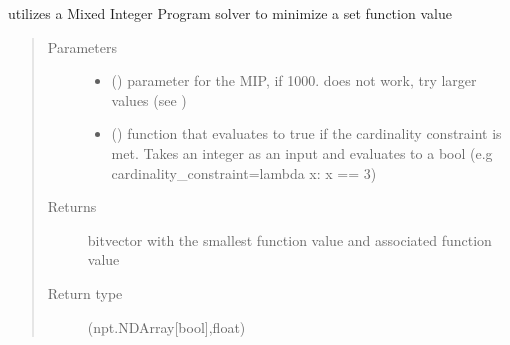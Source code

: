 \documentclass[letterpaper,10pt,english]{sphinxmanual}
\begin{document}
\begin{fulllineitems}
\begin{fulllineitems}
\begin{quote}
\begin{description}
\end{description}\end{quote}

\end{fulllineitems}


\begin{fulllineitems}
\label{\detokenize{setFTs:setFTs.setfunctions.SparseDSFTFunction.minimize_MIP}}
\sphinxAtStartPar
utilizes a Mixed Integer Program solver to minimize  a set function value
\begin{quote}\begin{description}
\item[{Parameters}] \leavevmode\begin{itemize}
\item {} 
\sphinxAtStartPar
{} () \textendash{} parameter for the MIP, if 1000. does not work, try larger values (see )

\item {} 
\sphinxAtStartPar
{} () \textendash{} function that evaluates to true if the cardinality constraint is met. Takes an integer as an input and evaluates to a bool (e.g cardinality\_constraint=lambda x: x == 3)

\end{itemize}

\item[{Returns}] \leavevmode
\sphinxAtStartPar
bitvector with the smallest function value and associated function value

\item[{Return type}] \leavevmode
\sphinxAtStartPar
(npt.NDArray{[}bool{]},float)

\end{description}\end{quote}

\end{fulllineitems}


\end{fulllineitems}
\end{document}
